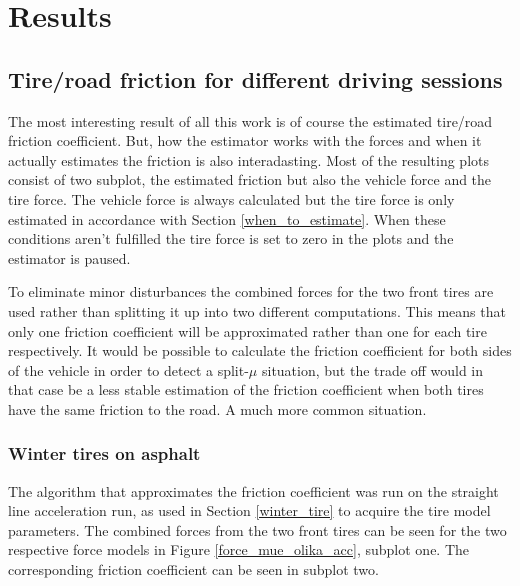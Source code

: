 \chapter{Results}
\label{chapter_five}

\section{Tire/road friction for different driving sessions}
The most interesting result of all this work is of course the estimated tire/road friction coefficient. But, how the estimator works with the forces and when it actually estimates the friction is also interadasting. Most of the resulting plots consist of two subplot, the estimated friction but also the vehicle force and the tire force. The vehicle force is always calculated but the tire force is only estimated in accordance with Section \ref{when_to_estimate}. When these conditions aren't fulfilled the tire force is set to zero in the plots and the estimator is paused.

To eliminate minor disturbances the combined forces for the two front tires are used rather than splitting it up into two different computations. This means that only one friction coefficient will be approximated rather than one for each tire respectively. It would be possible to calculate the friction coefficient for both sides of the vehicle in order to detect a split-$ \mu $ situation, but the trade off would in that case be a less stable estimation of the friction coefficient when both tires have the same friction to the road. A much more common situation.

\subsection{Winter tires on asphalt}
The algorithm that approximates the friction coefficient was run on the straight line acceleration run, as used in Section \ref{winter_tire} to acquire the tire model parameters. The combined forces from the two front tires can be seen for the two respective force models in Figure \ref{force_mue_olika_acc}, subplot one. The corresponding friction coefficient can be seen in subplot two. 

